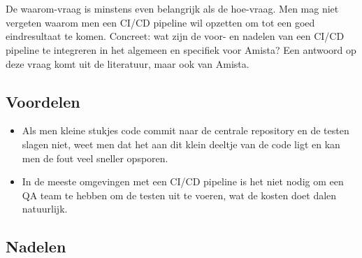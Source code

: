 
\chapter{}
\label{ch:onderzoeksdomein1}
De waarom-vraag is minstens even belangrijk als de hoe-vraag. Men mag niet vergeten waarom men een CI/CD pipeline wil opzetten om tot een goed eindresultaat te komen. Concreet: wat zijn de voor- en nadelen van een CI/CD pipeline te integreren in het algemeen en specifiek voor Amista?
Een antwoord op deze vraag komt uit de literatuur, maar ook van Amista.

\section{Voordelen}
\label{sec:voordelen}
\begin{itemize}
    \item Als men kleine stukjes code commit naar de centrale repository en de testen slagen niet, weet men dat het aan dit klein deeltje van de code ligt en kan men de fout veel sneller opsporen.
    \item In de meeste omgevingen met een CI/CD pipeline is het niet nodig om een QA team te hebben om de testen uit te voeren, wat de kosten doet dalen natuurlijk.
\end{itemize}

\section{Nadelen}
\label{sec:nadelen}

